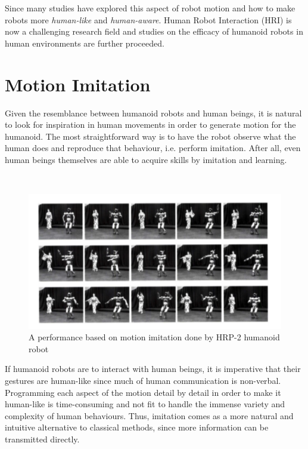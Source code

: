 Since many studies have explored this aspect of robot motion and how to make robots more \textit{human-like} and 
\textit{human-aware}. Human Robot Interaction (HRI) is now a challenging research field and studies on the efficacy 
of humanoid robots in human environments are further proceeded.


\section{Motion Imitation}

Given the resemblance between humanoid robots and human beings, it is natural to look for inspiration in human movements
in order to generate motion for the humanoid. The most straightforward way is to have the robot observe what the human 
does and reproduce that behaviour, i.e. perform imitation. After all, even human beings themselves are able to acquire 
skills by imitation and learning.

~


\begin{figure}[h!]
\centering
\includegraphics[scale=0.5]{images/motion-imitation.png}\hfill
\caption[A motion imitation performance by HRP-2 humanoid robot]{A performance  based on motion imitation done by 
HRP-2 humanoid robot}\hfill
\label{marker-based-system}
\end{figure}


If humanoid robots are to interact with human beings, it is imperative that their gestures are human-like since much of
human communication is non-verbal. Programming each aspect of the motion detail by detail in order to make it human-like
is time-consuming and not fit to handle the immense variety and complexity of human behaviours. Thus, imitation comes
as a more natural and intuitive alternative to classical methods, since more information can be transmitted directly.

